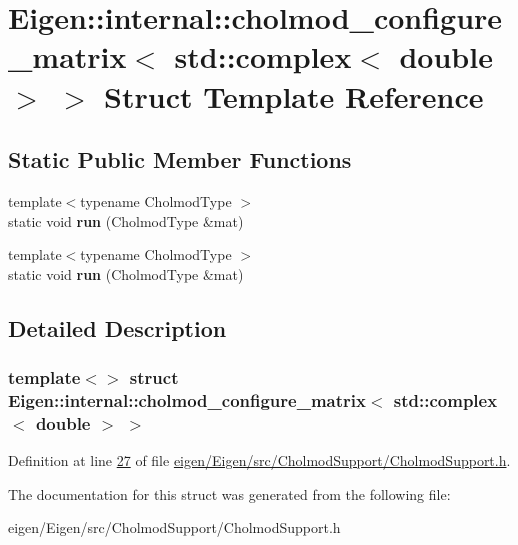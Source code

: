 \hypertarget{struct_eigen_1_1internal_1_1cholmod__configure__matrix_3_01std_1_1complex_3_01double_01_4_01_4}{}\section{Eigen\+:\+:internal\+:\+:cholmod\+\_\+configure\+\_\+matrix$<$ std\+:\+:complex$<$ double $>$ $>$ Struct Template Reference}
\label{struct_eigen_1_1internal_1_1cholmod__configure__matrix_3_01std_1_1complex_3_01double_01_4_01_4}
\subsection*{Static Public Member Functions}
\begin{DoxyCompactItemize}
\item 
\mbox{\label{struct_eigen_1_1internal_1_1cholmod__configure__matrix_3_01std_1_1complex_3_01double_01_4_01_4_ab3560344879b16337d17862725beb787}} 
{\footnotesize template$<$typename Cholmod\+Type $>$ }\\static void {\bfseries run} (Cholmod\+Type \&mat)
\item 
\mbox{\label{struct_eigen_1_1internal_1_1cholmod__configure__matrix_3_01std_1_1complex_3_01double_01_4_01_4_ab3560344879b16337d17862725beb787}} 
{\footnotesize template$<$typename Cholmod\+Type $>$ }\\static void {\bfseries run} (Cholmod\+Type \&mat)
\end{DoxyCompactItemize}


\subsection{Detailed Description}
\subsubsection*{template$<$$>$\newline
struct Eigen\+::internal\+::cholmod\+\_\+configure\+\_\+matrix$<$ std\+::complex$<$ double $>$ $>$}



Definition at line \hyperlink{eigen_2_eigen_2src_2_cholmod_support_2_cholmod_support_8h_source_l00027}{27} of file \hyperlink{eigen_2_eigen_2src_2_cholmod_support_2_cholmod_support_8h_source}{eigen/\+Eigen/src/\+Cholmod\+Support/\+Cholmod\+Support.\+h}.



The documentation for this struct was generated from the following file\+:\begin{DoxyCompactItemize}
\item 
eigen/\+Eigen/src/\+Cholmod\+Support/\+Cholmod\+Support.\+h\end{DoxyCompactItemize}
